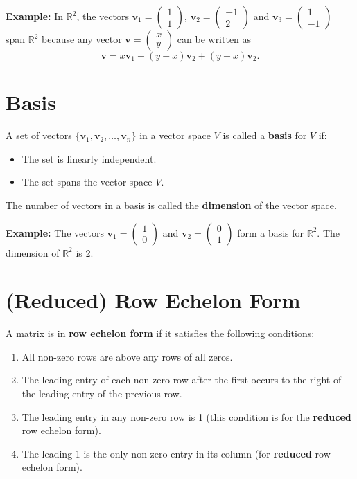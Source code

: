 \documentclass[]{article}
\begin{document}
	\noindent \textbf{Example:}
	In $\mathbb{R}^2$, the vectors
	$\mathbf{v}_1 = \begin{pmatrix} 1 \\ 1 \end{pmatrix}$,
	$\mathbf{v}_2 = \begin{pmatrix} -1 \\ 2 \end{pmatrix}$
	and
	$\mathbf{v}_3 = \begin{pmatrix} 1 \\ -1 \end{pmatrix}$
	span $\mathbb{R}^2$ because any vector
	$\mathbf{v} = \begin{pmatrix} x \\ y \end{pmatrix}$
	can be written as
	$$
	\mathbf{v} = x\mathbf{v}_1 + (y-x)\mathbf{v}_2 + (y-x)\mathbf{v}_2.
	$$
	
	\section{Basis}
	
	A set of vectors $\{\mathbf{v}_1, \mathbf{v}_2, \dots, \mathbf{v}_n\}$ in a vector space $V$ is called a \textbf{basis} for $V$ if:
	\begin{itemize}
		\item The set is linearly independent.
		\item The set spans the vector space $V$.
	\end{itemize}
	
	The number of vectors in a basis is called the \textbf{dimension} of the vector space.
	
	\noindent \textbf{Example:}
	The vectors $\mathbf{v}_1 = \begin{pmatrix} 1 \\ 0 \end{pmatrix}$ and $\mathbf{v}_2 = \begin{pmatrix} 0 \\ 1 \end{pmatrix}$ form a basis for $\mathbb{R}^2$.
	The dimension of $\mathbb{R}^2$ is 2.
	
	\section{(Reduced) Row Echelon Form}
	
	A matrix is in \textbf{row echelon form} if it satisfies the following conditions:
	\begin{enumerate}
		\item All non-zero rows are above any rows of all zeros.
		\item The leading entry of each non-zero row after the first occurs to the right of the leading entry of the previous row.
		\item The leading entry in any non-zero row is 1 (this condition is for the \textbf{reduced} row echelon form).
		\item The leading 1 is the only non-zero entry in its column (for \textbf{reduced} row echelon form).
	\end{enumerate}
	
\end{document}
